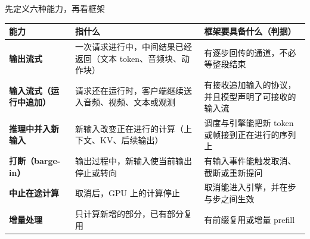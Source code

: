 
\begin{frame}[t]{先定义六种能力，再看框架}
\scriptsize
\renewcommand{\arraystretch}{1.12}
\setlength{\tabcolsep}{3pt}
\begin{tabularx}{\textwidth}{>{\bfseries}p{2.6cm} Y Y}
\toprule
{}
能力 & 指什么 & 框架要具备什么（判据） \\
\midrule
输出流式 & 一次请求进行中，中间结果已经返回（文本 token、音频块、动作块） & 有逐步回传的通道，不必等整段结束 \\
输入流式（运行中追加） & 请求还在运行时，客户端继续送入音频、视频、文本或观测 & 有接收追加输入的协议，并且模型声明了可接收的输入流 \\
推理中并入新输入 & 新输入改变正在进行的计算（上下文、KV、后续输出） & 调度与引擎能把新 token 或帧接到正在进行的序列上 \\
打断（barge-in） & 输出过程中，新输入使当前输出停止或转向 & 有输入事件能触发取消、截断或重新提问 \\
中止在途计算 & 取消后，GPU 上的计算停止 & 取消能进入引擎，并在步与步之间生效 \\
增量处理 & 只计算新增的部分，已有部分复用 & 有前缀复用或增量 prefill \\
\bottomrule
\end{tabularx}
\par{}
\par{}
\end{frame}

